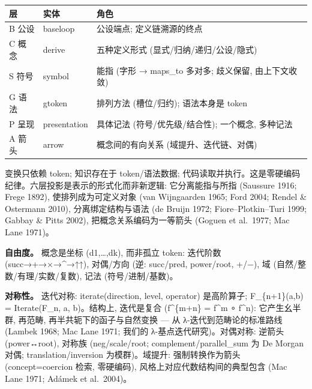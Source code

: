 \documentclass[
]{article}
\begin{document}
\begin{longtable}[]{@{}
  >{\raggedright\arraybackslash}p{}
  >{\raggedright\arraybackslash}p{}
  >{\raggedright\arraybackslash}p{}@{}}
\toprule\noalign{}
\begin{minipage}[b]{\linewidth}\raggedright
层
\end{minipage} & \begin{minipage}[b]{\linewidth}\raggedright
实体
\end{minipage} & \begin{minipage}[b]{\linewidth}\raggedright
角色
\end{minipage} \\
\midrule\noalign{}
\endhead
\bottomrule\noalign{}
\endlastfoot
B 公设 & baseloop & 公设端点; 定义链溯源的终点 \\
C 概念 & derive & 五种定义形式 (显式/归纳/递归/公设/隐式) \\
S 符号 & symbol & 能指 (字形 → maps\_to 多对多; 歧义保留,
由上下文收敛) \\
G 语法 & gtoken & 排列方法 (槽位/归约); 语法本身是 token \\
P 呈现 & presentation & 具体记法 (符号/优先级/结合性); 一个概念,
多种记法 \\
A 箭头 & arrow & 概念间的有向关系 (域提升、迭代链、对偶) \\
\end{longtable}

变换只依赖 token; 知识存在于 token/语法数据;
代码读取并执行。这是零硬编码纪律。六层投影是表示的形式化而非新逻辑:
它分离能指与所指 (Saussure 1916; Frege 1892), 使排列成为可定义对象 (van
Wijngaarden 1965; Ford 2004; Rendel \& Ostermann 2010),
分离绑定结构与语法 (de Bruijn 1972; Fiore--Plotkin--Turi 1999; Gabbay \&
Pitts 2002), 把概念关系编码为一等箭头 (Goguen et al.~1977; Mac Lane
1971)。

\textbf{自由度。} 概念是坐标 (d1,\ldots,dk), 而非孤立 token: 迭代阶数
(succ→+→×→\^{}→↑↑), 对偶/方向 (逆: succ/pred, power/root, +/−), 域
(自然/整数/有理/实数/复数), 记法 (符号/进制/基数)。

\textbf{对称性。} 迭代对称: iterate(direction, level, operator)
是高阶算子; F\_\{n+1\}(a,b) = Iterate(F\_n, a, b)。结构上, 迭代是复合
(f\^{}\{m+n\} = f\^{}m ∘ f\^{}n): 它产生幺半群, 再范畴,
再半共轭下的函子与自然变换 --- 从 λ-迭代到范畴论的标准路线 (Lambek 1968;
Mac Lane 1971; 我们的 λ-基点迭代研究)。对偶对称: 逆箭头 (power↔root),
对称族 (neg/scale/root; complement/parallel\_sum 为 De Morgan 对偶;
translation/inversion 为模群)。域提升: 强制转换作为箭头
(concept=coercion 检索, 零硬编码), 风格上对应代数结构间的典型包含 (Mac
Lane 1971; Adámek et al.~2004)。
\end{document}
